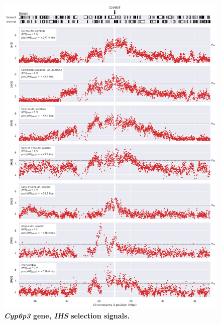\documentclass[a4paper,11pt,abstracton,hidelinks]{scrartcl}
\begin{document}
\begin{figure}[t!]
	\begin{center}
		\includegraphics*[width=1\linewidth,center]{artwork/locus_cyp6p3_ihs_pdist.png}
	\end{center}
	\caption[\textit{Cyp6p3} gene, \textit{IHS} selection signals]{
	\textbf{\textit{Cyp6p3} gene, \textit{IHS} selection signals.}
	} 
	\label{fig:locus_cyp6p3_ihs}
\end{figure}


\clearpage
\end{document}
